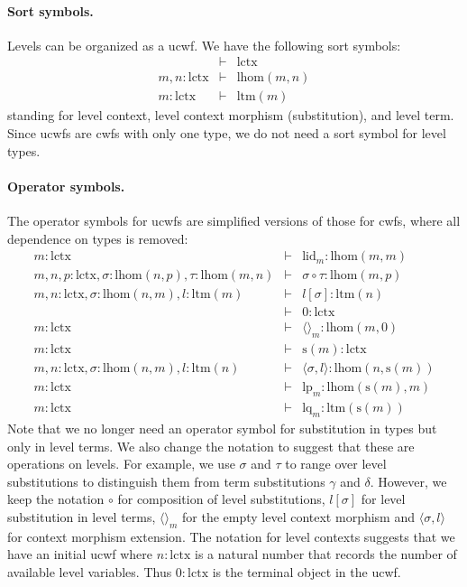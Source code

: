 \documentclass[11pt,a4paper]{article}
\theoremstyle{plain}
\theoremstyle{definition}
\def\lhom{\mathrm{lhom}}
\def\lHom{\mathrm{lhom}}
\def\lctx{\mathrm{lctx}}
\def\ltm{\mathrm{ltm}}
\def\lp{\mathrm{lp}}
\def\lq{\mathrm{lq}}
\def\s{\mathrm{s}}
\def\lid{\mathrm{lid}}
\def\cp{\mathrm{cp}}
\def\cq{\mathrm{cq}}
\newcommand{\tuple}[1]{\langle #1 \rangle}
\begin{document}
\paragraph{Sort symbols.} Levels can be organized as a ucwf. We have the following sort symbols:
\begin{eqnarray*}
&\vdash& \lctx\\
m, n : \lctx &\vdash& \lHom(m,n)\\
m : \lctx &\vdash& \ltm(m)
\end{eqnarray*}
standing for level context, level context morphism (substitution), and level term.
Since ucwfs are cwfs with only one type, we do not need a sort symbol for level types. 

\paragraph{Operator symbols.} The operator symbols for ucwfs are simplified versions of those for cwfs, where all dependence on types is removed:
\begin{eqnarray*}
m : \lctx &\vdash& \lid_m : \lhom(m,m)\\
m, n, p : \lctx, \sigma : \lhom(n,p), \tau : \lhom(m,n) &\vdash&
\sigma \circ \tau : \lhom(m,p)\\
m,n: \lctx, \sigma : \lhom(n,m), l :\ltm(m) &\vdash&  l[\sigma] : \ltm(n)\\
&\vdash& 0 : \lctx\\
m : \lctx &\vdash& \tuple{}_m : \lhom(m,0)\\
m : \lctx &\vdash& \s(m) : \lctx\\
m,n : \lctx, \sigma : \lhom(n,m), l:\ltm(n) &\vdash& \tuple{\sigma,l} : \lhom(n,\s(m))\\
m : \lctx &\vdash& \lp_m: \lhom(\s(m),m)\\
m : \lctx &\vdash& \lq_m: \ltm(\s(m))
\end{eqnarray*}
Note that we no longer need an operator symbol for substitution in types but only in level terms. We also change the notation to suggest that these are operations on levels. For example, we use $\sigma$ and $\tau$ to range over level substitutions to distinguish them from term substitutions $\gamma$ and $\delta$. However, we keep the notation $\circ$ for composition of level substitutions, $l[\sigma]$ for level substitution in level terms, $\tuple{}_m$ for the empty level context morphism and $\tuple{\sigma,l}$ for context morphism extension. The notation for level contexts suggests that we have an initial ucwf where $n : \lctx$ is a natural number that records the number of available level variables. Thus $0 : \lctx$ is the terminal object in the ucwf.
\end{document}
